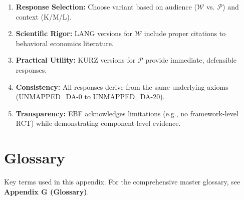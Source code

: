 \begin{tcolorbox}[colback=blue!5!white, colframe=blue!75!black,
    title=Key Takeaways]
\begin{enumerate}
    \item \textbf{Response Selection:} Choose variant based on audience ($\mathcal{W}$ vs. $\mathcal{P}$) and context (K/M/L).

    \item \textbf{Scientific Rigor:} LANG versions for $\mathcal{W}$ include proper citations to behavioral economics literature.

    \item \textbf{Practical Utility:} KURZ versions for $\mathcal{P}$ provide immediate, defensible responses.

    \item \textbf{Consistency:} All responses derive from the same underlying axioms (UNMAPPED_DA-0 to UNMAPPED_DA-20).

    \item \textbf{Transparency:} EBF acknowledges limitations (e.g., no framework-level RCT) while demonstrating component-level evidence.
\end{enumerate}
\end{tcolorbox}

\section{Glossary}
\label{sec:da2-glossary}

Key terms used in this appendix. For the comprehensive master glossary, see \textbf{Appendix G (Glossary)}.

